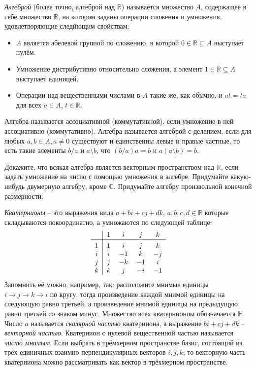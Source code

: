 \documentclass[a4paper, 12pt]{article}
\begin{document}



	\emph{Алгеброй} (более точно, алгеброй над $\mathbb{R}$) называется множество $A$, содержащее в себе множество $\mathbb{R}$, на котором заданы операции сложения и умножения, удовлетворяющие следйющим свойствам:
	\begin{itemize}
		\item $A$ является абелевой группой по сложению, в которой $0 \in \mathbb{R} \subseteq A$ выступает нулём.
		\item Умножение дистрибутивно относительно сложения, а элемент $1 \in \mathbb{R} \subseteq A$ выступает единицей.
		\item Операции над вещественными числами в $A$ такие же, как обычно, и $at=ta$ для всех $a \in A$, $t \in \mathbb{R}$.
	\end{itemize}
	Алгебра называется ассоциативной (коммутативной), если умножение в ней ассоциативно (коммутативно). Алгебра называется алгеброй с делением, если для любых $a,b \in A, a \neq 0$ существуют и единственны левые и правые частные, то есть такие элементы $b/a$ и $a \setminus b$, что $(b/a)a=b$ и $a(a \setminus b) =b$.

	 Докажите, что всякая алгебра является векторным пространством над $\mathbb{R}$, если задать умножение на число с помощью умножения в алгебре.  Придумайте какую-нибудь двумерную алгебру, кроме $\mathbb{C}$.  Придумайте алгебру произвольной конечной размерности.

	\emph{Кватернионы} -- это выражения вида $a+bi+cj+dk$, $a,b,c,d \in \mathbb{R}$ которые складываются покоординатно, а умножаются по следующей таблице:
	\[
	\begin{tabular}{c|cccc}%
		   & 1   & $i$   & $j$ & $k$   \\
		\hline\vrule height 12pt width 0pt
		1   & 1   & $i$   & $j$ & $k$     \\
		$i$   & $i$   & $-1$ & $k$   & $-j$    \\
		$j$ & $j$ & $-k$   & $-1$  & $i$    \\
		$k$  & $k$  & $j$   & $-i$   & $-1$   \\
	\end{tabular}
	\]
	Запомнить её можно, например, так: расположите мнимые единицы $i \to j \to k \to i$ по кругу, тогда произведение каждой мнимой единицы на следующую равно третьей, а произведение мнимой единицы на предыдущую равно третьей со знаком минус. Множество всех кватернионоы обозначается $\mathbb{H}$. Число $a$ называется \emph{скалярной частью} кватерниона, а выражение $bi+cj+dk$ -- \emph{векторной частью}. Кватернион с нулевой вещественной частью называется \emph{чисто мнимым}. Если выбрать в трёмхерном пространстве базис, состоящий из трёх единичных взаимно перпендикулярных векторов $i,j,k$, то векторную часть кватерниона можно рассматривать как вектор в трёхмерном пространстве.
\end{document}
